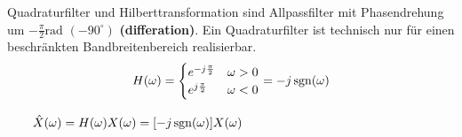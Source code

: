 \label{lti_quadratur}\label{lti_hilbert}
Quadraturfilter und Hilberttransformation sind Allpassfilter mit
Phasendrehung um $-\frac{\pi}{2}\text{rad } (-90^\circ)$ \textbf{(differation)}.
Ein Quadraturfilter ist technisch nur für einen beschränkten
Bandbreitenbereich realisierbar.
\[
H(\omega) = \begin{cases}
             	e^{-j \frac{\pi}{2}} & \omega > 0 \\
             	e^{j \frac{\pi}{2}} & \omega < 0
             \end{cases} =
-j \operatorname{sgn}(\omega)
\]

$\qquad \hat{X}(\omega) = H(\omega)X(\omega) = [-j \operatorname{sgn}(\omega)] X(\omega)$